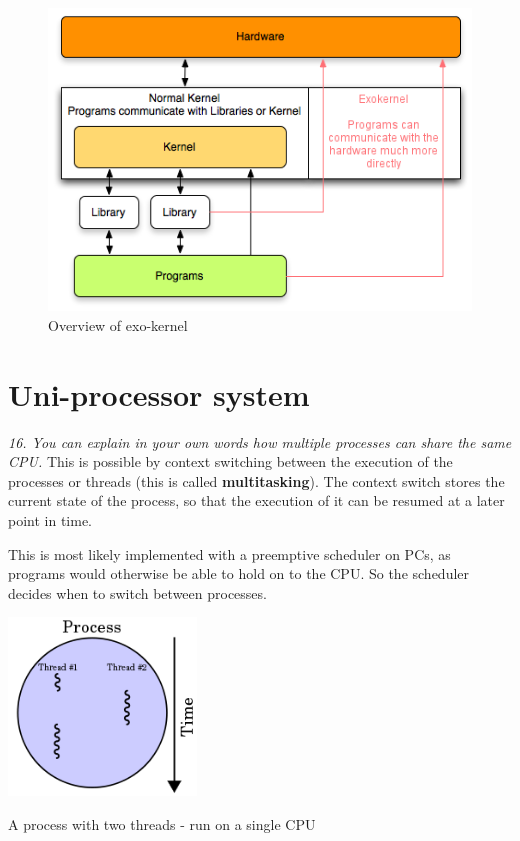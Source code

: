 \documentclass{article}
\begin{document}
\begin{figure}[H]
  \centering
  \includegraphics[scale=0.5]{images/exokernel.png}
  \caption[Caption for LOF]{Overview of exo-kernel\footnotemark}
\end{figure}


\section{Uni-processor system}
\emph{16. You can explain in your own words how multiple processes can share the same CPU.}
This is possible by context switching between the execution of the processes or threads (this is called \textbf{multitasking}). The context switch stores the current state of the process, so that the execution of it can be resumed at a later point in time.

This is most likely implemented with a preemptive scheduler on PCs, as programs would otherwise be able to hold on to the CPU. So the scheduler decides when to switch between processes.

\begin{center}
\includegraphics[width=5.0cm]{images/220px-Multithreaded_process.png}

A process with two threads - run on a single CPU
\end{center}
\end{document}
